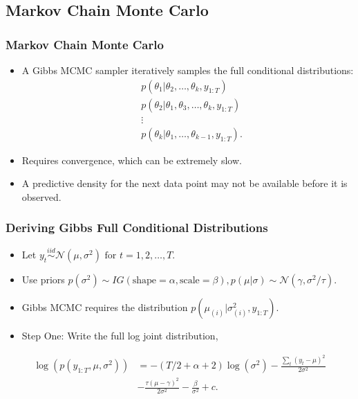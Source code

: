 \documentclass{beamer}\usepackage[]{graphicx}\usepackage[]{color}
\begin{document}
\begin{frame}
\section{Markov Chain Monte Carlo}
\frametitle{Markov Chain Monte Carlo}
\begin{itemize}
\item A Gibbs MCMC sampler iteratively samples the full conditional distributions:
\begin{align}
&p(\theta_1 | \theta_2, \dots, \theta_k, y_{1:T}) \nonumber \\
&p(\theta_2 | \theta_1, \theta_3, \dots, \theta_k, y_{1:T}) \nonumber \\
&\vdots \nonumber \\
&p(\theta_k | \theta_1, \dots, \theta_{k-1}, y_{1:T}). \nonumber
\end{align}
\item Requires convergence, which can be extremely slow.
\item A predictive density for the next data point may not be available before it is observed.
\end{itemize}
\end{frame}


\begin{frame}
\frametitle{Deriving Gibbs Full Conditional Distributions}
\begin{itemize}
\item Let $y_t \overset{iid}{\sim} \mathcal{N}(\mu, \sigma^2) \mbox{ for } t = 1, 2, \dots, T$. 
\item Use priors $p(\sigma^2) \sim IG(\mbox{shape} = \alpha, \mbox{scale} = \beta), p(\mu | \sigma) \sim \mathcal{N}(\gamma, \sigma^2/\tau)$.
\item Gibbs MCMC requires the distribution $p(\mu_{(i)} | \sigma^2_{(i)}, y_{1:T})$. 
\item Step One: Write the full log joint distribution,
\end{itemize}
\begin{align}
\log(p(y_{1:T}, \mu, \sigma^2)) &=  -(T/2 + \alpha + 2)\log(\sigma^2) - \frac{\sum_{t}(y_t - \mu)^2}{2\sigma^2} \nonumber \\
&- \frac{\tau(\mu - \gamma)^2}{2\sigma^2} - \frac{\beta}{\sigma^2}  + c. \nonumber 
\end{align}
\end{frame}
\end{document}
